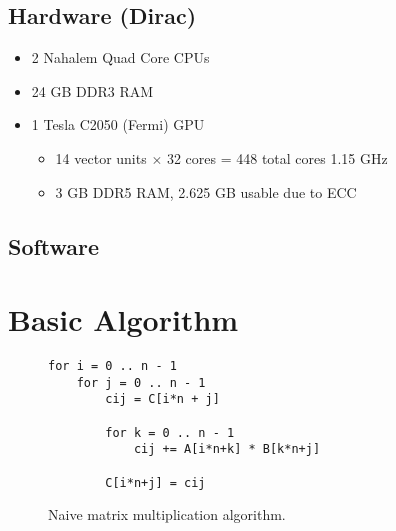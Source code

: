 \documentclass[12pt]{article}
\begin{document}
\subsection{Hardware (Dirac)}
\begin{itemize}
	\item 2 Nahalem Quad Core CPUs
	\item 24 GB DDR3 RAM
	\item 1 Tesla C2050 (Fermi) GPU
	\begin{itemize}
		\item 14 vector units $\times$ 32 cores = 448 total cores \@ 1.15 GHz
		\item 3 GB DDR5 RAM, 2.625 GB usable due to ECC
	\end{itemize}
\end{itemize}

\subsection{Software}

\section{Basic Algorithm}

\begin{figure}
\begin{lstlisting}
for i = 0 .. n - 1
	for j = 0 .. n - 1
		cij = C[i*n + j]

		for k = 0 .. n - 1
			cij += A[i*n+k] * B[k*n+j]

		C[i*n+j] = cij
\end{lstlisting}
\caption{Naive matrix multiplication algorithm.}
\label{fig:naive_mul}
\end{figure}
\end{document}
